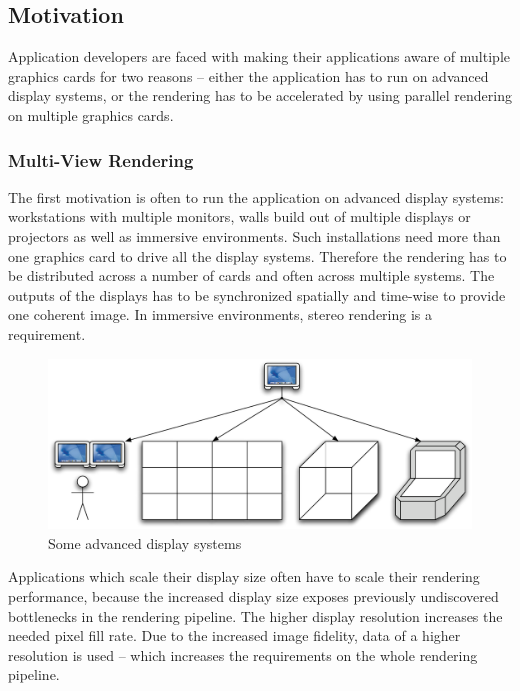\documentclass[10pt,a4paper]{scrartcl}
\begin{document}

\subsection{Motivation}
Application developers are faced with making their applications
aware of multiple graphics cards for two reasons -- either the
application has to run on advanced display systems, or the rendering has
to be accelerated by using parallel rendering on multiple graphics cards.

\subsubsection{Multi-View Rendering}
The first motivation is often to run the application on advanced display
systems: workstations with multiple monitors, walls build out of
multiple displays or projectors as well as immersive environments. Such
installations need more than one graphics card to drive all the display
systems. Therefore the rendering has to be distributed across a
number of cards and often across multiple systems. The outputs of the
displays has to be synchronized spatially and time-wise to provide one
coherent image. In immersive environments, stereo rendering is a requirement.

\begin{figure}[ht]
\centering
\includegraphics[width=0.9\columnwidth]{images/sp_to_mp.pdf}
\caption{Some advanced display systems}
\label{FIG_parallel}
\end{figure}

Applications which scale their display size often have to scale
their rendering performance, because the increased display size exposes
previously undiscovered bottlenecks in the rendering pipeline. The higher
display resolution increases the needed pixel fill rate. Due to the increased
image fidelity, data of a higher resolution is used -- which increases
the requirements on the whole rendering pipeline.
\end{document}
